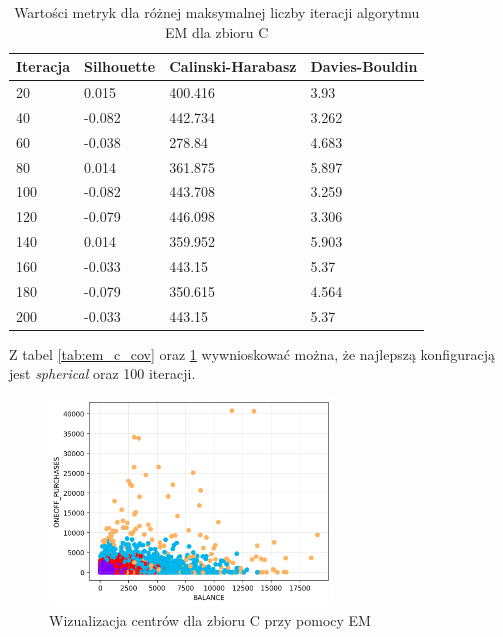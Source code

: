 \documentclass[a4paper,11pt]{article}
\begin{document}
\begin{table}[H]
    \centering
    \begin{tabular}{|l|l|l|l|}
    \hline
    \textbf{Iteracja} & \textbf{Silhouette} & \textbf{Calinski-Harabasz} & \textbf{Davies-Bouldin} \\ \hline
    20                & 0.015               & 400.416                    & 3.93                    \\ \hline
    40                & -0.082              & 442.734                    & 3.262                   \\ \hline
    60                & -0.038              & 278.84                     & 4.683                   \\ \hline
    80                & 0.014               & 361.875                    & 5.897                   \\ \hline
    100               & -0.082              & 443.708                    & 3.259                   \\ \hline
    120               & -0.079              & 446.098                    & 3.306                   \\ \hline
    140               & 0.014               & 359.952                    & 5.903                   \\ \hline
    160               & -0.033              & 443.15                     & 5.37                    \\ \hline
    180               & -0.079              & 350.615                    & 4.564                   \\ \hline
    200               & -0.033              & 443.15                     & 5.37                    \\ \hline
    \end{tabular}
    \caption{Wartości metryk dla różnej maksymalnej liczby iteracji algorytmu EM dla zbioru C}
    \label{tab:em_c_iter}
\end{table}

Z tabel \ref{tab:em_c_cov} oraz \ref{tab:em_c_iter} wywnioskować można, że najlepszą konfiguracją jest \textit{spherical} oraz 100 iteracji.

\begin{figure}[H]
    \centering
    \includegraphics[width=0.67\textwidth]{images2/EM/cc/ExpectationMaximization_CC_xBALANCE_yONEOFF_PURCHASES.png}
    \caption{Wizualizacja centrów dla zbioru C przy pomocy EM}
    \label{fig:em_c_1}
\end{figure}
\end{document}
